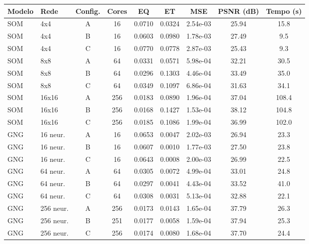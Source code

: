 \begin{tabular}{llccccccc}
\toprule
Modelo & Rede & Config. & Cores & EQ & ET & MSE & PSNR (dB) & Tempo (s)\\
\midrule
SOM & 4x4 & A & 16 & 0.0710 & 0.0324 & 2.54e-03 & 25.94 & 15.8\\
SOM & 4x4 & B & 16 & 0.0603 & 0.0980 & 1.78e-03 & 27.49 & 9.5\\
SOM & 4x4 & C & 16 & 0.0770 & 0.0778 & 2.87e-03 & 25.43 & 9.3\\
\midrule
SOM & 8x8 & A & 64 & 0.0331 & 0.0571 & 5.98e-04 & 32.21 & 30.5\\
SOM & 8x8 & B & 64 & 0.0296 & 0.1303 & 4.46e-04 & 33.49 & 35.0\\
SOM & 8x8 & C & 64 & 0.0349 & 0.1097 & 6.86e-04 & 31.63 & 34.1\\
\midrule
SOM & 16x16 & A & 256 & 0.0183 & 0.0890 & 1.96e-04 & 37.04 & 108.4\\
SOM & 16x16 & B & 256 & 0.0168 & 0.1427 & 1.53e-04 & 38.12 & 104.8\\
SOM & 16x16 & C & 256 & 0.0185 & 0.1086 & 1.99e-04 & 36.99 & 102.0\\
\midrule
GNG & 16 neur. & A & 16 & 0.0653 & 0.0047 & 2.02e-03 & 26.94 & 23.3\\
GNG & 16 neur. & B & 16 & 0.0607 & 0.0010 & 1.77e-03 & 27.50 & 23.8\\
GNG & 16 neur. & C & 16 & 0.0643 & 0.0008 & 2.00e-03 & 26.99 & 22.5\\
\midrule
GNG & 64 neur. & A & 64 & 0.0305 & 0.0072 & 4.99e-04 & 33.01 & 24.8\\
GNG & 64 neur. & B & 64 & 0.0297 & 0.0041 & 4.43e-04 & 33.52 & 41.0\\
GNG & 64 neur. & C & 64 & 0.0308 & 0.0031 & 5.13e-04 & 32.88 & 22.1\\
\midrule
GNG & 256 neur. & A & 256 & 0.0173 & 0.0143 & 1.65e-04 & 37.79 & 26.3\\
GNG & 256 neur. & B & 251 & 0.0177 & 0.0058 & 1.59e-04 & 37.94 & 25.3\\
GNG & 256 neur. & C & 256 & 0.0174 & 0.0080 & 1.68e-04 & 37.70 & 24.4\\
\bottomrule
\end{tabular}
